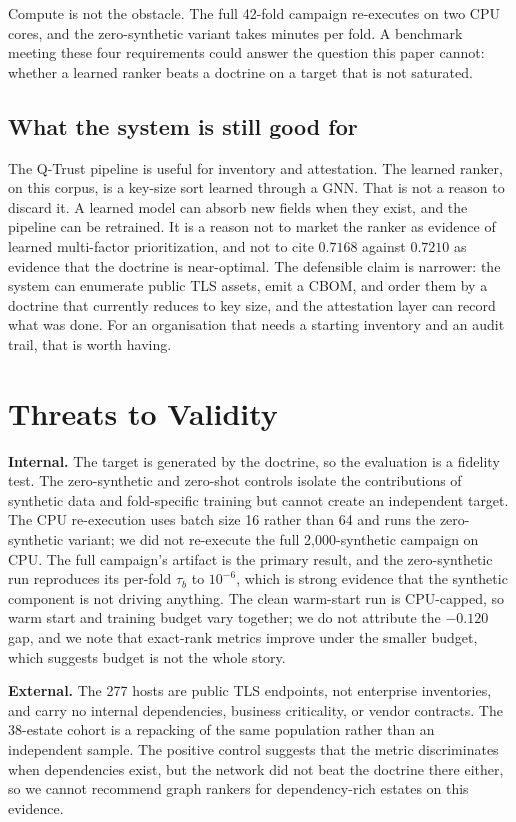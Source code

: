 \documentclass[journal,10pt]{IEEEtran}
\newcommand{\tb}{\tau_b}
\begin{document}
Compute is not the obstacle. The full 42-fold campaign re-executes on two CPU cores, and the
zero-synthetic variant takes minutes per fold. A benchmark meeting these four requirements could
answer the question this paper cannot: whether a learned ranker beats a doctrine on a target that
is not saturated.

\subsection{What the system is still good for}

The Q-Trust pipeline is useful for inventory and attestation. The learned ranker, on this corpus, is
a key-size sort learned through a GNN. That is not a reason to discard it. A learned model can
absorb new fields when they exist, and the pipeline can be retrained. It is a reason not to market
the ranker as evidence of learned multi-factor prioritization, and not to cite $0.7168$ against
$0.7210$ as evidence that the doctrine is near-optimal. The defensible claim is narrower: the system
can enumerate public TLS assets, emit a CBOM, and order them by a doctrine that currently reduces to
key size, and the attestation layer can record what was done. For an organisation that needs a
starting inventory and an audit trail, that is worth having.

\section{Threats to Validity}
\label{sec:threats}

\textbf{Internal.} The target is generated by the doctrine, so the evaluation is a fidelity test.
The zero-synthetic and zero-shot controls isolate the contributions of synthetic data and
fold-specific training but cannot create an independent target. The CPU re-execution uses batch
size 16 rather than 64 and runs the zero-synthetic variant; we did not re-execute the full
2{,}000-synthetic campaign on CPU. The full campaign's artifact is the primary result, and the
zero-synthetic run reproduces its per-fold $\tb$ to $10^{-6}$, which is strong evidence that the
synthetic component is not driving anything. The clean warm-start run is CPU-capped, so warm start
and training budget vary together; we do not attribute the $-0.120$ gap, and we note that
exact-rank metrics improve under the smaller budget, which suggests budget is not the whole story.

\textbf{External.} The 277 hosts are public TLS endpoints, not enterprise inventories, and carry no
internal dependencies, business criticality, or vendor contracts. The 38-estate cohort is a
repacking of the same population rather than an independent sample. The positive control suggests
that the metric discriminates when dependencies exist, but the network did not beat the doctrine
there either, so we cannot recommend graph rankers for dependency-rich estates on this evidence.
\end{document}
